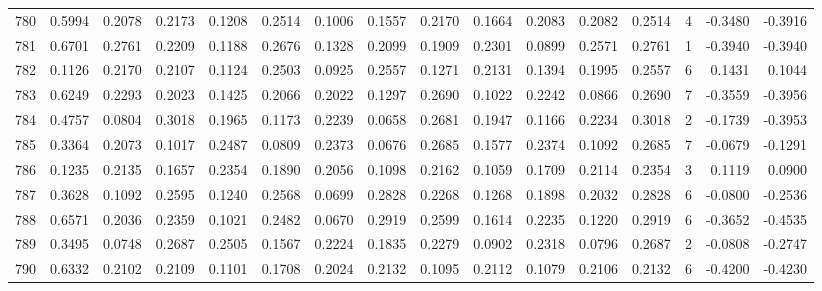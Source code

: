 \begin{tabular}{lrrrrrrrrrrrrrrr}
780 &      0.5994 &  0.2078 &  0.2173 &  0.1208 &  0.2514 &  0.1006 &  0.1557 &  0.2170 &  0.1664 &  0.2083 &   0.2082 &     0.2514 &      4 &                   -0.3480 &                    -0.3916 \\
781 &      0.6701 &  0.2761 &  0.2209 &  0.1188 &  0.2676 &  0.1328 &  0.2099 &  0.1909 &  0.2301 &  0.0899 &   0.2571 &     0.2761 &      1 &                   -0.3940 &                    -0.3940 \\
782 &      0.1126 &  0.2170 &  0.2107 &  0.1124 &  0.2503 &  0.0925 &  0.2557 &  0.1271 &  0.2131 &  0.1394 &   0.1995 &     0.2557 &      6 &                    0.1431 &                     0.1044 \\
783 &      0.6249 &  0.2293 &  0.2023 &  0.1425 &  0.2066 &  0.2022 &  0.1297 &  0.2690 &  0.1022 &  0.2242 &   0.0866 &     0.2690 &      7 &                   -0.3559 &                    -0.3956 \\
784 &      0.4757 &  0.0804 &  0.3018 &  0.1965 &  0.1173 &  0.2239 &  0.0658 &  0.2681 &  0.1947 &  0.1166 &   0.2234 &     0.3018 &      2 &                   -0.1739 &                    -0.3953 \\
785 &      0.3364 &  0.2073 &  0.1017 &  0.2487 &  0.0809 &  0.2373 &  0.0676 &  0.2685 &  0.1577 &  0.2374 &   0.1092 &     0.2685 &      7 &                   -0.0679 &                    -0.1291 \\
786 &      0.1235 &  0.2135 &  0.1657 &  0.2354 &  0.1890 &  0.2056 &  0.1098 &  0.2162 &  0.1059 &  0.1709 &   0.2114 &     0.2354 &      3 &                    0.1119 &                     0.0900 \\
787 &      0.3628 &  0.1092 &  0.2595 &  0.1240 &  0.2568 &  0.0699 &  0.2828 &  0.2268 &  0.1268 &  0.1898 &   0.2032 &     0.2828 &      6 &                   -0.0800 &                    -0.2536 \\
788 &      0.6571 &  0.2036 &  0.2359 &  0.1021 &  0.2482 &  0.0670 &  0.2919 &  0.2599 &  0.1614 &  0.2235 &   0.1220 &     0.2919 &      6 &                   -0.3652 &                    -0.4535 \\
789 &      0.3495 &  0.0748 &  0.2687 &  0.2505 &  0.1567 &  0.2224 &  0.1835 &  0.2279 &  0.0902 &  0.2318 &   0.0796 &     0.2687 &      2 &                   -0.0808 &                    -0.2747 \\
790 &      0.6332 &  0.2102 &  0.2109 &  0.1101 &  0.1708 &  0.2024 &  0.2132 &  0.1095 &  0.2112 &  0.1079 &   0.2106 &     0.2132 &      6 &                   -0.4200 &                    -0.4230 \\

\end{tabular}
